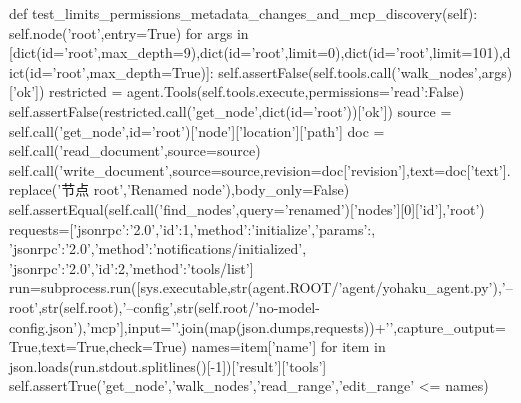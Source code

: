     def test_limits_permissions_metadata_changes_and_mcp_discovery(self):
        self.node('root',entry=True)
        for args in [dict(id='root',max_depth=9),dict(id='root',limit=0),dict(id='root',limit=101),dict(id='root',max_depth=True)]:
            self.assertFalse(self.tools.call('walk_nodes',args)['ok'])
        restricted = agent.Tools(self.tools.execute,permissions={'read':False})
        self.assertFalse(restricted.call('get_node',dict(id='root'))['ok'])
        source = self.call('get_node',id='root')['node']['location']['path']
        doc = self.call('read_document',source=source)
        self.call('write_document',source=source,revision=doc['revision'],text=doc['text'].replace('节点 root','Renamed node'),body_only=False)
        self.assertEqual(self.call('find_nodes',query='renamed')['nodes'][0]['id'],'root')
        requests=[{'jsonrpc':'2.0','id':1,'method':'initialize','params':{}},
                  {'jsonrpc':'2.0','method':'notifications/initialized'},
                  {'jsonrpc':'2.0','id':2,'method':'tools/list'}]
        run=subprocess.run([sys.executable,str(agent.ROOT/'agent/yohaku_agent.py'),'--root',str(self.root),'--config',str(self.root/'no-model-config.json'),'mcp'],input='\n'.join(map(json.dumps,requests))+'\n',capture_output=True,text=True,check=True)
        names={item['name'] for item in json.loads(run.stdout.splitlines()[-1])['result']['tools']}
        self.assertTrue({'get_node','walk_nodes','read_range','edit_range'} <= names)


